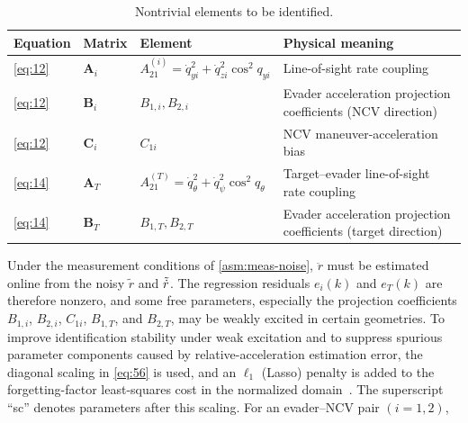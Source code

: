 \begin{table}[htbp]
\centering
\caption{Nontrivial elements to be identified.}
\label{tab:nontrivial}
\small
\begin{tabularx}{\linewidth}{lXXX}
\toprule
Equation & Matrix & Element & Physical meaning \\
\midrule
\eqref{eq:12} & ${{\mathbf{A}}_i}$ & $A_{21}^{(i)} = \dot q_{yi}^2 + \dot q_{zi}^2{\cos ^2}{q_{yi}}$ & Line-of-sight rate coupling \\
\eqref{eq:12} & ${{\mathbf{B}}_i}$ & ${B_{1,i}},{B_{2,i}}$ & Evader acceleration projection coefficients (NCV direction) \\
\eqref{eq:12} & ${{\mathbf{C}}_i}$ & ${C_{1i}}$ & NCV maneuver-acceleration bias \\
\eqref{eq:14} & ${{\mathbf{A}}_T}$ & $A_{21}^{(T)} = \dot q_\theta ^2 + \dot q_\psi ^2{\cos ^2}{q_\theta }$ & Target--evader line-of-sight rate coupling \\
\eqref{eq:14} & ${{\mathbf{B}}_T}$ & ${B_{1,T}},{B_{2,T}}$ & Evader acceleration projection coefficients (target direction) \\
\bottomrule
\end{tabularx}
\end{table}
\FloatBarrier

Under the measurement conditions of \cref{asm:meas-noise}, $\ddot r$ must be estimated online from the noisy $\tilde{r}$ and $\tilde{\dot{r}}$. The regression residuals ${e_i}(k)$ and ${e_T}(k)$ are therefore nonzero, and some free parameters, especially the projection coefficients ${B_{1,i}}$, ${B_{2,i}}$, ${C_{1i}}$, ${B_{1,T}}$, and ${B_{2,T}}$, may be weakly excited in certain geometries. To improve identification stability under weak excitation and to suppress spurious parameter components caused by relative-acceleration estimation error, the diagonal scaling in \eqref{eq:56} is used, and an ${\ell _1}$ (Lasso) penalty is added to the forgetting-factor least-squares cost in the normalized domain~\cite{ljung1999}. The superscript ``sc'' denotes parameters after this scaling. For an evader--NCV pair $(i = 1,2)$,

